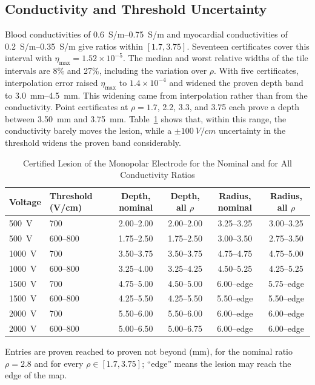 \documentclass[11pt]{article}
\begin{document}
\subsection{Conductivity and Threshold Uncertainty}\label{sec:rangeresults}
Blood conductivities of \SIrange{0.6}{0.75}{S/m} and myocardial conductivities
of \SIrange{0.2}{0.35}{S/m} give ratios within $[1.7,3.75]$. Seventeen certificates
cover this interval with $\eta_{\max}=1.52\times10^{-5}$. The median and worst
relative widths of the tile intervals are 8\% and 27\%, including the variation
over $\rho$. With five certificates, interpolation error raised
$\eta_{\max}$ to $1.4\times10^{-4}$ and widened the proven depth band to
\SIrange{3.0}{4.5}{mm}. This widening came from interpolation rather than from the conductivity. Point certificates at $\rho=1.7$, 2.2, 3.3, and 3.75 each prove a
depth between \SI{3.50}{mm} and \SI{3.75}{mm}. Table~\ref{tab:ranges} shows that, within this range,
the conductivity barely moves the lesion, while a $\pm\SI{100}{V/cm}$
uncertainty in the threshold widens the proven band considerably.

\begin{table}[t]
\centering
\caption{Certified Lesion of the Monopolar Electrode for the Nominal and for All Conductivity Ratios}\label{tab:ranges}
\small\setlength{\tabcolsep}{4pt}
\begin{tabular}{llcccc}
\toprule
Voltage & Threshold (V/cm) & Depth, nominal & Depth, all $\rho$ & Radius, nominal & Radius, all $\rho$\\
\midrule
\SI{500}{V} & 700 & 2.00--2.00 & 2.00--2.00 & 3.25--3.25 & 3.00--3.25\\
\SI{500}{V} & 600--800 & 1.75--2.50 & 1.75--2.50 & 3.00--3.50 & 2.75--3.50\\
\SI{1000}{V} & 700 & 3.50--3.75 & 3.50--3.75 & 4.75--4.75 & 4.75--5.00\\
\SI{1000}{V} & 600--800 & 3.25--4.00 & 3.25--4.25 & 4.50--5.25 & 4.25--5.25\\
\SI{1500}{V} & 700 & 4.75--5.00 & 4.50--5.00 & 6.00--edge & 5.75--edge\\
\SI{1500}{V} & 600--800 & 4.25--5.50 & 4.25--5.50 & 5.50--edge & 5.50--edge\\
\SI{2000}{V} & 700 & 5.50--6.00 & 5.50--6.00 & 6.00--edge & 6.00--edge\\
\SI{2000}{V} & 600--800 & 5.00--6.50 & 5.00--6.75 & 6.00--edge & 6.00--edge\\
\bottomrule
\end{tabular}
\par\vspace{2pt}\footnotesize\raggedright Entries are proven reached to proven not beyond (mm), for the nominal ratio $\rho=2.8$ and for every $\rho\in[1.7,3.75]$; ``edge'' means the lesion may reach the edge of the map.
\end{table}
\end{document}
